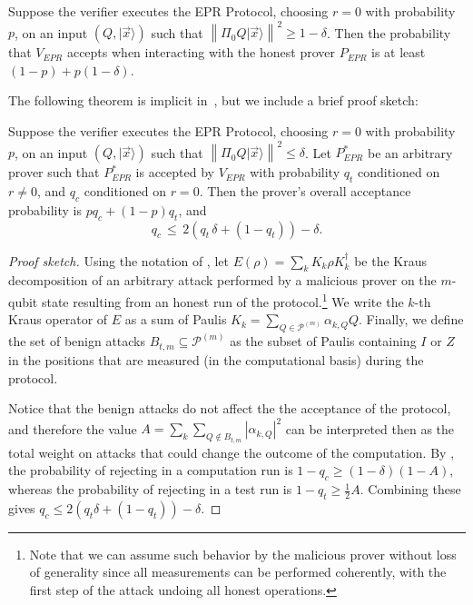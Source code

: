 \documentclass{toc}
\newcommand{\ket}[1]{|#1\rangle}
\newcommand{\norm}[1]{\left\|#1\right\|}
\newcommand{\paulin}{\mathcal{P}^{(m)}\!}
\begin{document}
\begin{theorem}[Completeness]\label{thm:EPR-correctness} 
Suppose the verifier executes the EPR Protocol, choosing $r=0$ with probability $p$, on an input $(Q,\ket{\vec{x}})$ such that $\norm{\Pi_0 Q\ket{\vec{x}}}^2\geq 1-\delta$. Then the probability that $V_{EPR}$ accepts when interacting with the honest prover $P_{EPR}$ is at least $(1-p)+p(1-\delta)$. 
\end{theorem}

The following theorem is implicit in~\cite[Section 7.6]{broadbent15howtoverify}, but we include a brief proof sketch:

\begin{theorem}[Soundness]\label{thm:EPR-soundness} 
Suppose the verifier executes the EPR Protocol, choosing $r=0$ with probability~$p$, on an input $(Q,\ket{\vec{x}})$ such that $\norm{\Pi_0 Q\ket{\vec{x}}}^2\leq \delta$. Let $P_{EPR}^*$ be an arbitrary prover such that $P_{EPR}^*$ is accepted by  $V_{EPR}$ with probability $q_t$ conditioned on $r\neq 0$, and $q_c$ conditioned on $r=0$. Then the prover's overall acceptance probability is $pq_c+(1-p)q_t$, and
$$q_c \,\leq\, 2\left(q_t\,\delta+(1-q_t)\right)-\delta.$$ 
\end{theorem}
\begin{proof}[Proof sketch]
Using the notation of \cite{broadbent15howtoverify}, let $E(\rho) = \sum_{k} K_k \rho K_k^\dagger$ be the Kraus decomposition of an arbitrary attack  performed by a malicious prover on the $m$-qubit state resulting from an honest run of the protocol.\footnote{Note that we can assume such behavior by the malicious prover without loss of generality since  all measurements can be performed coherently, with the first step of the attack undoing all honest operations.}  We write the $k$-th Kraus operator of $E$ as a sum of Paulis $K_k = \sum_{Q\in
  \paulin} \alpha_{k,Q} Q$. Finally, we define the set of benign attacks $B_{t,m} \subseteq \paulin$ as the subset of Paulis containing $I$ or $Z$ in the positions that are measured (in the computational basis) during the protocol.
  
  Notice that the benign attacks do not affect the the acceptance of the protocol, and therefore the value 
$A=\sum_k\sum_{Q 
\not\in
  B_{t,m}}|\alpha_{k,Q}|^2$ can be interpreted then as the total weight on attacks that could change the outcome of the computation. By \cite{broadbent15howtoverify}, the probability of rejecting in a computation run is $1-q_c\geq (1-\delta)(1-A)$, whereas the probability of rejecting in a test run is $1-q_t\geq \frac{1}{2}A$. Combining these gives $q_c\leq 2(q_t\delta+(1-q_t))-\delta$.
\end{proof}
\end{document}

